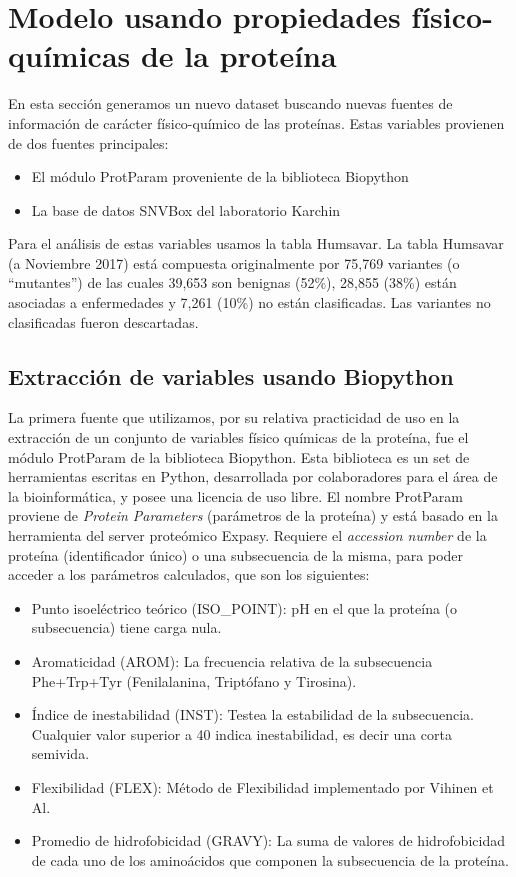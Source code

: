 
\section{Modelo usando propiedades físico-químicas de la proteína}

En esta sección generamos un nuevo dataset buscando nuevas fuentes de información de carácter físico-químico de las proteínas. Estas variables provienen de dos fuentes principales:

\begin{itemize}
    \item El módulo ProtParam proveniente de la biblioteca Biopython \cite{Chapman:2000:BPT:360262.360268}
    \item La base de datos SNVBox del laboratorio Karchin \cite{Wong2011}
\end{itemize}

Para el análisis de estas variables usamos la tabla Humsavar. La tabla Humsavar (a Noviembre 2017) está compuesta originalmente por 75,769 variantes (o ``mutantes'') de las cuales 39,653 son benignas (52\%), 28,855 (38\%) están asociadas a enfermedades y 7,261 (10\%) no están clasificadas. Las variantes no clasificadas fueron descartadas. 

\subsection{Extracción de variables usando Biopython}

La primera fuente que utilizamos, por su relativa practicidad de uso en la extracción de un conjunto de variables físico químicas de la proteína, fue el módulo ProtParam de la biblioteca Biopython. Esta biblioteca es un set de herramientas escritas en Python, desarrollada por colaboradores para el área de la bioinformática, y posee una licencia de uso libre.
El nombre ProtParam proviene de \textit{Protein Parameters} (parámetros de la proteína) y está basado en la herramienta del server proteómico Expasy. Requiere el \textit{accession number} de la proteína (identificador único) o una subsecuencia de la misma, para poder acceder a los parámetros calculados, que son los siguientes:

\begin{itemize}
    \item Punto isoeléctrico teórico (ISO\_POINT): pH en el que la proteína (o subsecuencia) tiene carga nula. 
    \item Aromaticidad (AROM): La frecuencia relativa de la subsecuencia Phe+Trp+Tyr (Fenilalanina, Triptófano y Tirosina). 
    \item Índice de inestabilidad (INST): Testea la estabilidad de la subsecuencia. Cualquier valor superior a 40 indica inestabilidad, es decir una corta semivida.
    \item Flexibilidad (FLEX): Método de Flexibilidad implementado por Vihinen et Al.  
    \item Promedio de hidrofobicidad (GRAVY): La suma de valores de hidrofobicidad de cada uno de los aminoácidos que componen la subsecuencia de la proteína.
\end{itemize}

